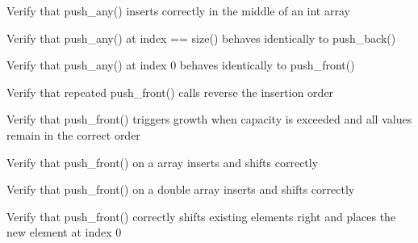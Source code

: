 \begin{DoxyRefList}
Verify that push\+\_\+any() inserts correctly in the middle of an int array  
\item[Global \doxylink{test__array_8cpp_a9978dba5a3ed986496f992bf1dc48214}{TEST\+\_\+F} (\doxylink{classArrayInitTest}{Array\+Init\+Test}, Push\+Any\+At\+Size\+Matches\+Push\+Back)]\label{test__test000027}%
%
Verify that push\+\_\+any() at index == size() behaves identically to push\+\_\+back()  
\item[Global \doxylink{test__array_8cpp_afbbc1d8cd74e0f0f3534d6690787bf72}{TEST\+\_\+F} (\doxylink{classArrayInitTest}{Array\+Init\+Test}, Push\+Any\+At\+Index\+Zero\+Matches\+Push\+Front)]\label{test__test000026}%
%
Verify that push\+\_\+any() at index 0 behaves identically to push\+\_\+front()  
\item[Global \doxylink{test__array_8cpp_addc187b550ee6063c685faefe186626a}{TEST\+\_\+F} (\doxylink{classArrayInitTest}{Array\+Init\+Test}, Push\+Front\+Repeated\+Reverses\+Order)]\label{test__test000025}%
%
Verify that repeated push\+\_\+front() calls reverse the insertion order  
\item[Global \doxylink{test__array_8cpp_a1c63717b3aea83ce487b18c114e280da}{TEST\+\_\+F} (\doxylink{classArrayInitTest}{Array\+Init\+Test}, Push\+Front\+Triggers\+Growth)]\label{test__test000024}%
%
Verify that push\+\_\+front() triggers growth when capacity is exceeded and all values remain in the correct order  
\item[Global \doxylink{test__array_8cpp_a3467f6e910ea1a0f8df2ec1581a9e3fa}{TEST\+\_\+F} (\doxylink{classArrayInitTest}{Array\+Init\+Test}, Push\+Front\+Point\+Shifts\+Elements)]\label{test__test000023}%
%
Verify that push\+\_\+front() on a  array inserts and shifts correctly  
\item[Global \doxylink{test__array_8cpp_aa125fdf7ed83d048424547dff3f0f173}{TEST\+\_\+F} (\doxylink{classArrayInitTest}{Array\+Init\+Test}, Push\+Front\+Double\+Shifts\+Elements)]\label{test__test000022}%
%
Verify that push\+\_\+front() on a double array inserts and shifts correctly  
\item[Global \doxylink{test__array_8cpp_ad4745457a9dd421bed4d4508baa9f7fc}{TEST\+\_\+F} (\doxylink{classArrayInitTest}{Array\+Init\+Test}, Push\+Front\+Int\+Shifts\+Elements)]\label{test__test000021}%
%
Verify that push\+\_\+front() correctly shifts existing elements right and places the new element at index 0  

\end{DoxyRefList}
